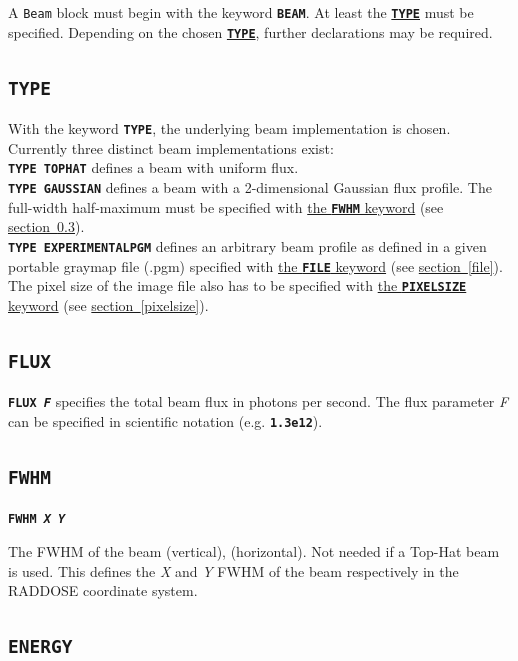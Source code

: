 \documentclass[a4paper]{article}
\newcommand{\Class}[1]{\texttt{#1}\xspace}
\newcommand{\Keyword}[1]{\texttt{\textbf{#1}}\xspace}
\newcommand{\SB}{\\[0.2em]}
\begin{document}
A \Class{Beam} block must begin with the keyword \Keyword{BEAM}.
At least the \hyperref[beamtype]{\Keyword{TYPE}} must be specified.
Depending on the chosen \hyperref[beamtype]{\Keyword{TYPE}}, further declarations may be required.


\subsection{\Keyword{TYPE}}
\label{beamtype}

With the keyword \Keyword{TYPE}, the underlying beam implementation is chosen.
Currently three distinct beam implementations exist:\SB

\noindent \Keyword{TYPE TOPHAT} defines a beam with uniform flux.\SB

\noindent \Keyword{TYPE GAUSSIAN} defines a beam with a 2-dimensional Gaussian flux profile. The full-width half-maximum must be specified with \hyperref[beamfwhm]{the \Keyword{FWHM} keyword} (see \hyperref[beamfwhm]{section~\ref*{beamfwhm}}).\SB

\noindent \Keyword{TYPE EXPERIMENTALPGM} defines an arbitrary beam profile as defined in a given portable graymap file (.pgm) specified with \hyperref[file]{the \Keyword{FILE} keyword} (see \hyperref[file]{section~\ref*{file}}). The pixel size of the image file also has to be specified with \hyperref[pixelsize]{the \Keyword{PIXELSIZE} keyword} (see \hyperref[pixelsize]{section~\ref*{pixelsize}}).\SB


\subsection{\Keyword{FLUX}}
\label{flux}

\noindent \Keyword{FLUX \textit{F}} specifies the total beam flux in photons per second. The flux parameter \textit{F} can be specified in scientific notation (e.g. \Keyword{1.3e12}).


\subsection{\Keyword{FWHM}}

\label{beamfwhm}
\noindent \Keyword{FWHM \textit{X Y}}

The FWHM of the beam (vertical), (horizontal). Not needed if a Top-Hat beam is used.
This defines the \textit{X} and \textit{Y} FWHM of the beam respectively in the RADDOSE coordinate system.


\subsection{\Keyword{ENERGY}}
\end{document}

